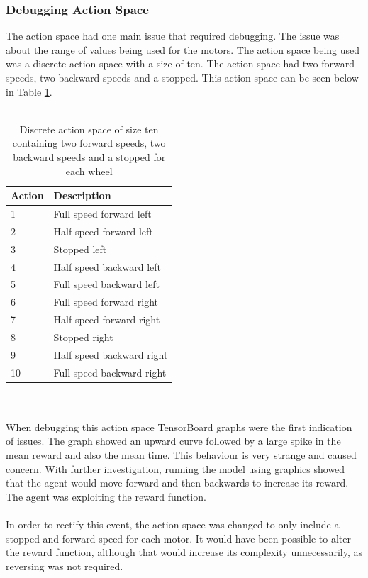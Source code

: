\documentclass[a4paper,12pt]{article}
\begin{document}
\subsubsection{Debugging Action Space}
The action space had one main issue that required debugging. The issue was about the range of values being used for the motors. The action space being used was a discrete action space with a size of ten. The action space had two forward speeds, two backward speeds and a stopped. This action space can be seen below in Table \ref{tab:Discrete action space of size ten}.
\\\\
\begin{table}[H]
\centering
\caption{Discrete action space of size ten containing two forward speeds, two backward speeds and a stopped for each wheel}
\label{tab:Discrete action space of size ten}
\begin{tabular}{|ll|}
\hline
\textbf{Action} & \textbf{Description}\\ \hline
1 & Full speed forward left \\ 
2 & Half speed forward left \\ 
3 & Stopped left \\ 
4 & Half speed backward left \\ 
5 & Full speed backward left \\ 
6 & Full speed forward right \\ 
7 & Half speed forward right \\ 
8 & Stopped right \\ 
9 & Half speed backward right \\ 
10 & Full speed backward right \\ \hline
\end{tabular}
\end{table}
\\\\
When debugging this action space TensorBoard graphs were the first indication of issues. The graph showed an upward curve followed by a large spike in the mean reward and also the mean time. This behaviour is very strange and caused concern. With further investigation, running the model using graphics showed that the agent would move forward and then backwards to increase its reward. The agent was exploiting the reward function. 
\\\\
In order to rectify this event, the action space was changed to only include a stopped and forward speed for each motor. It would have been possible to alter the reward function, although that would increase its complexity unnecessarily, as reversing was not required. 
\end{document}
